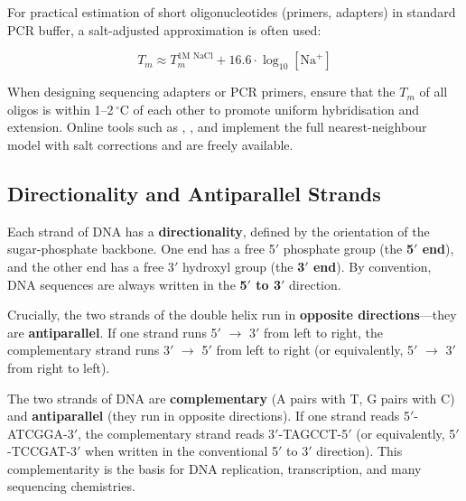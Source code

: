 For practical estimation of short oligonucleotides (primers, adapters) in standard PCR buffer, a salt-adjusted approximation is often used:

\begin{equation}
T_m \approx T_m^{1\text{M NaCl}} + 16.6 \cdot \log_{10}[\text{Na}^+]
\label{eq:molbio:tm-salt}
\end{equation}

\begin{tipbox}
When designing sequencing adapters or \acrshort{PCR} primers, ensure that the $T_m$ of all oligos is within 1--2$\,^\circ$C of each other to promote uniform hybridisation and extension. Online tools such as , , and  implement the full nearest-neighbour model with salt corrections and are freely available.
\end{tipbox}


\subsection{Directionality and Antiparallel Strands}
\label{subsec:molbio:directionality}

Each strand of DNA has a \textbf{directionality}, defined by the orientation of the sugar-phosphate backbone. One end has a free 5$'${} phosphate group (the \textbf{5$'${} end}), and the other end has a free 3$'${} hydroxyl group (the \textbf{3$'${} end}). By convention, DNA sequences are always written in the \textbf{5$'${} to 3$'${}} direction.

Crucially, the two strands of the double helix run in \textbf{opposite directions}---they are \textbf{antiparallel}. If one strand runs 5$'${} $\rightarrow$ 3$'${} from left to right, the complementary strand runs 3$'${} $\rightarrow$ 5$'${} from left to right (or equivalently, 5$'${} $\rightarrow$ 3$'${} from right to left).

\begin{keyconcept}[title={Complementarity and Antiparallel Strands}]
The two strands of DNA are \textbf{complementary} (A pairs with T, G pairs with C) and \textbf{antiparallel} (they run in opposite directions). If one strand reads 5$'${}-ATCGGA-3$'${}, the complementary strand reads 3$'${}-TAGCCT-5$'${} (or equivalently, 5$'${}-TCCGAT-3$'${} when written in the conventional 5$'${} to 3$'${} direction). This complementarity is the basis for DNA replication, transcription, and many sequencing chemistries.
\end{keyconcept}

